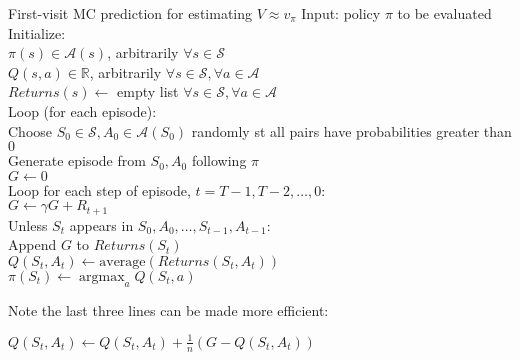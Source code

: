 \documentclass[twocolumn]{article}
\DeclareMathOperator*{\argmax}{argmax}
\begin{document}
\begin{mydef}{First-visit MC prediction for estimating $V \approx v_\pi$}{}
    Input: policy $\pi$ to be evaluated \\

    Initialize: \\
        \hspace*{2em}$\pi(s) \in \mathcal A(s)$, arbitrarily $\forall s \in \mathcal S$ \\
        \hspace*{2em}$Q(s, a) \in \mathbb R$, arbitrarily $\forall s \in \mathcal S, \forall a \in \mathcal A$ \\
        \hspace*{2em}$Returns(s) \leftarrow$ empty list $\forall s \in \mathcal S, \forall a \in \mathcal A$ \\

    Loop (for each episode): \\
        \hspace*{2em}Choose $S_0 \in \mathcal S, A_0 \in \mathcal A(S_0)$ randomly st all pairs have probabilities greater than $0$ \\
        \hspace*{2em}Generate episode from $S_0, A_0$ following $\pi$ \\
        \hspace*{2em}$G \leftarrow 0$ \\
        \hspace*{2em}Loop for each step of episode, $t = T-1, T-2, \dots, 0$: \\
            \hspace*{4em}$G \leftarrow \gamma G + R_{t+1}$ \\
            \hspace*{4em}Unless $S_t$ appears in $S_0, A_0, \dots, S_{t-1}, A_{t-1}$: \\
                \hspace*{6em}Append $G$ to $Returns(S_t)$ \\
                \hspace*{6em}$Q(S_t, A_t) \leftarrow \text{average}(Returns(S_t, A_t))$ \\
                \hspace*{6em}$\pi(S_t) \leftarrow \argmax_a Q(S_t, a)$
\end{mydef}

Note the last three lines can be made more efficient:

$Q(S_t, A_t) \leftarrow Q(S_t, A_t) + \frac{1}{n} (G - Q(S_t, A_t))$
\end{document}
